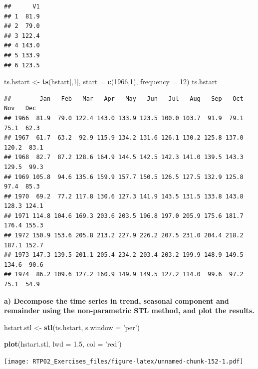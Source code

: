\documentclass[
]{article}
\newenvironment{Shaded}{\begin{snugshade}}{\end{snugshade}}
\newcommand{\DataTypeTok}[1]{\textcolor[rgb]{0.13,0.29,0.53}{#1}}
\newcommand{\DecValTok}[1]{\textcolor[rgb]{0.00,0.00,0.81}{#1}}
\newcommand{\FloatTok}[1]{\textcolor[rgb]{0.00,0.00,0.81}{#1}}
\newcommand{\KeywordTok}[1]{\textcolor[rgb]{0.13,0.29,0.53}{\textbf{#1}}}
\newcommand{\NormalTok}[1]{#1}
\newcommand{\StringTok}[1]{\textcolor[rgb]{0.31,0.60,0.02}{#1}}
\begin{document}
\begin{verbatim}
##      V1
## 1  81.9
## 2  79.0
## 3 122.4
## 4 143.0
## 5 133.9
## 6 123.5
\end{verbatim}

\begin{Shaded}
\begin{Highlighting}[]
\NormalTok{ts.hstart <-}\StringTok{ }\KeywordTok{ts}\NormalTok{(hstart[,}\DecValTok{1}\NormalTok{], }\DataTypeTok{start =} \KeywordTok{c}\NormalTok{(}\DecValTok{1966}\NormalTok{,}\DecValTok{1}\NormalTok{), }\DataTypeTok{frequency =} \DecValTok{12}\NormalTok{)}
\NormalTok{ts.hstart}
\end{Highlighting}
\end{Shaded}

\begin{verbatim}
##        Jan   Feb   Mar   Apr   May   Jun   Jul   Aug   Sep   Oct   Nov   Dec
## 1966  81.9  79.0 122.4 143.0 133.9 123.5 100.0 103.7  91.9  79.1  75.1  62.3
## 1967  61.7  63.2  92.9 115.9 134.2 131.6 126.1 130.2 125.8 137.0 120.2  83.1
## 1968  82.7  87.2 128.6 164.9 144.5 142.5 142.3 141.0 139.5 143.3 129.5  99.3
## 1969 105.8  94.6 135.6 159.9 157.7 150.5 126.5 127.5 132.9 125.8  97.4  85.3
## 1970  69.2  77.2 117.8 130.6 127.3 141.9 143.5 131.5 133.8 143.8 128.3 124.1
## 1971 114.8 104.6 169.3 203.6 203.5 196.8 197.0 205.9 175.6 181.7 176.4 155.3
## 1972 150.9 153.6 205.8 213.2 227.9 226.2 207.5 231.0 204.4 218.2 187.1 152.7
## 1973 147.3 139.5 201.1 205.4 234.2 203.4 203.2 199.9 148.9 149.5 134.6  90.6
## 1974  86.2 109.6 127.2 160.9 149.9 149.5 127.2 114.0  99.6  97.2  75.1  54.9
\end{verbatim}

\textbf{a) Decompose the time series in trend, seasonal component and
remainder using the non-parametric STL method, and plot the results.}

\begin{Shaded}
\begin{Highlighting}[]
\NormalTok{hstart.stl <-}\StringTok{ }\KeywordTok{stl}\NormalTok{(ts.hstart, }\DataTypeTok{s.window =} \StringTok{'per'}\NormalTok{)}

\KeywordTok{plot}\NormalTok{(hstart.stl, }\DataTypeTok{lwd =} \FloatTok{1.5}\NormalTok{, }\DataTypeTok{col =} \StringTok{'red'}\NormalTok{)}
\end{Highlighting}
\end{Shaded}

\texttt{[image: RTP02\_Exercises\_files/figure-latex/unnamed-chunk-152-1.pdf]}
\end{document}
